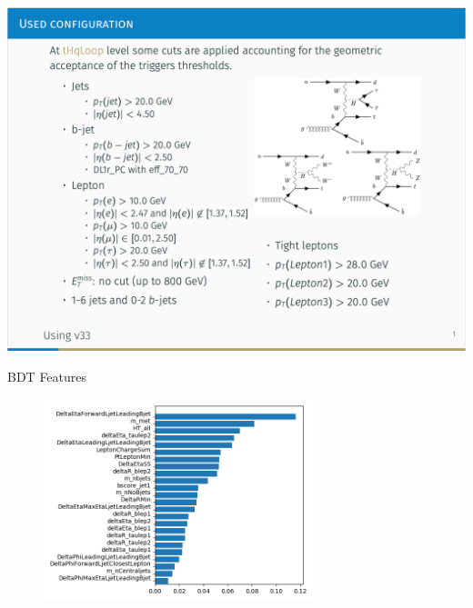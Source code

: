 
\begin{frame}{}
    \includegraphics[width=\textwidth]{pablo_selection}
\end{frame}


\begin{frame}{BDT Features}
    \begin{figure}
        \includegraphics[width=0.7\textwidth]{pablo_features.png}
    \end{figure}
\end{frame}


